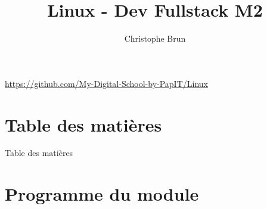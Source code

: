 \documentclass{beamer}
\title[Linux]{Linux - Dev Fullstack M2}
\author{Christophe Brun}
\institute{My Digital School}
\begin{document}
    \begin{frame}
        \titlepage
        \bigbreak
        \centering
        \url{https://github.com/My-Digital-School-by-PapIT/Linux}
    \end{frame}


    \section{Table des matières}\label{sec:toc}

    \begin{frame}{Table des matières}
        \begin{tiny}
            \begin{multicols}{3}
                \tableofcontents
            \end{multicols}
        \end{tiny}
    \end{frame}


    \section{Programme du module}\label{sec:programme-du-module}
\end{document}
